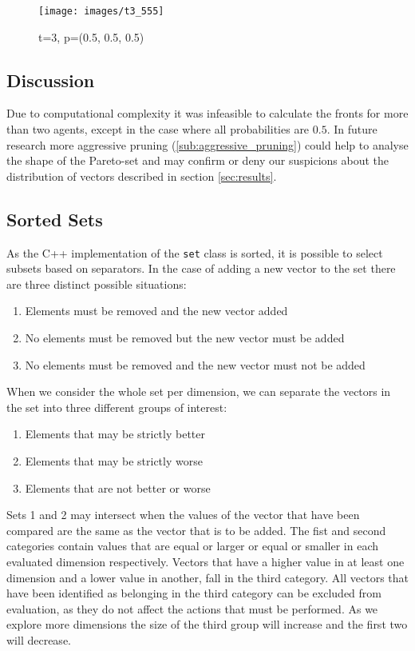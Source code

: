 \documentclass{article}
\begin{document}
	\begin{figure}
		\centering
		\texttt{[image: images/t3\_555]}
		\caption{t=3, p=(0.5, 0.5, 0.5)}
		\label{fig:t3_555}
	\end{figure}

	\newpage
	\begin{multicols}{2}
	\section{Discussion}
	\label{sec:discussion}
	Due to computational complexity it was infeasible to calculate the fronts
	for more than two agents, except in the case where all probabilities are
	$0.5$. In future research more aggressive pruning
	(\ref{sub:aggressive_pruning}) could help to analyse the shape of the
	Pareto-set and may confirm or deny our suspicions about the distribution of
	vectors described in section \ref{sec:results}.

	\subsection{Sorted Sets}
	\label{sub:sorted_sets}
	As the C++ implementation of the \texttt{set} class is sorted, it is
	possible to select subsets based on separators. In the case of adding a
	new vector to the set there are three distinct possible situations:
	\begin{enumerate}
		\item Elements must be removed and the new vector added
		\item No elements must be removed but the new vector must be added
		\item No elements must be removed and the new vector must not be added
	\end{enumerate}
	When we consider the whole set per dimension, we can separate the vectors
	in the set into three different groups of interest:
	\begin{enumerate}
		\item Elements that may be strictly better
		\item Elements that may be strictly worse
		\item Elements that are not better or worse
	\end{enumerate}
	Sets 1 and 2 may intersect when the values of the vector that have been
	compared are the same as the vector that is to be added. The fist and
	second categories contain values that are equal or larger or equal or
	smaller in each evaluated dimension respectively. Vectors that have a
	higher value in at least one dimension and a lower value in another, fall
	in the third category. All vectors that have been identified as belonging
	in the third category can be excluded from evaluation, as they do not
	affect the actions that must be performed. As we explore more dimensions
	the size of the third group will increase and the first two will decrease.


\end{multicols}
\end{document}
